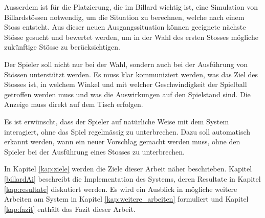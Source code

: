 Ausserdem ist für die Platzierung, die im Billard wichtig ist, eine Simulation von Billardstössen notwendig,
um die Situation zu berechnen, welche nach einem Stoss entsteht.
Aus dieser neuen Ausgangssituation können geeignete nächste Stösse gesucht und bewertet werden, um in der Wahl des
ersten Stosses mögliche zukünftige Stösse zu berücksichtigen.

Der Spieler soll nicht nur bei der Wahl, sondern auch bei der Ausführung von Stössen unterstützt werden.
Es muss klar kommuniziert werden, was das Ziel des Stosses ist, in welchem Winkel und mit welcher Geschwindigkeit
der Spielball getroffen werden muss und was die Auswirkungen auf den Spielstand sind.
Die Anzeige muss direkt auf dem Tisch erfolgen.

Es ist erwünscht, dass der Spieler auf natürliche Weise mit dem System interagiert, ohne das Spiel regelmässig zu unterbrechen.
Dazu soll automatisch erkannt werden, wann ein neuer Vorschlag gemacht werden muss, ohne den Spieler bei der Ausführung
eines Stosses zu unterbrechen.

In Kapitel \ref{kap:ziele} werden die Ziele dieser Arbeit näher beschrieben.
Kapitel \ref{billardAi} beschreibt die Implementation des Systems, deren Resultate in Kapitel \ref{kap:resultate}
diskutiert werden.
Es wird ein Ausblick in mögliche weitere Arbeiten am System in Kapitel \ref{kap:weitere_arbeiten} formuliert und
Kapitel \ref{kap:fazit} enthält das Fazit dieser Arbeit.
